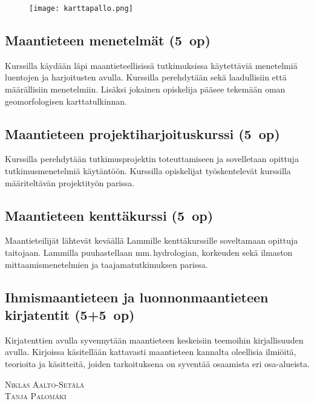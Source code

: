 \documentclass[../ala_hataile.tex]{subfiles}
\begin{document}
\begin{figure}[h]
	\texttt{[image: karttapallo.png]}
\end{figure}
\subsection*{Maantieteen menetelmät (5~op)}
Kurssilla käydään läpi maantieteellisissä
tutkimuksissa käytettäviä menetelmiä luentojen
ja harjoitusten avulla. Kurssilla perehdytään sekä 
laadullisiin että määrällisiin menetelmiin. Lisäksi
jokainen opiskelija pääsee tekemään oman 
geomorfologisen karttatulkinnan.

\subsection*{Maantieteen projektiharjoituskurssi (5~op)}
Kurssilla perehdytään tutkimusprojektin toteuttamiseen
ja sovelletaan opittuja tutkimusmenetelmiä käytäntöön.
Kurssilla opiskelijat työskentelevät kurssilla 
määriteltävän projektityön parissa.
\subsection*{Maantieteen kenttäkurssi (5~op)}
Maantieteilijät lähtevät keväällä Lammille
kenttäkurssille soveltamaan opittuja
taitojaan. Lammilla puuhastellaan
mm.\,hydrologian, korkeuden sekä ilmaston
mittaamismenetelmien ja taajamatutkimuksen
parissa. 

\subsection*{Ihmismaantieteen ja luonnonmaantieteen kirjatentit (5+5~op)}
Kirjatenttien avulla syvennytään 
maantieteen keskeisiin teemoihin
kirjallisuuden avulla. Kirjoissa käsitellään
kattavasti maantieteen kannalta oleellisia
ilmiöitä, teorioita ja käsitteitä, joiden tarkoituksena 
on syventää osaamista eri osa-alueista.

\vspace{0.5cm}\noindent\textsc{Niklas Aalto-Setälä}\\\textsc{Tanja Palomäki}
\end{document}
